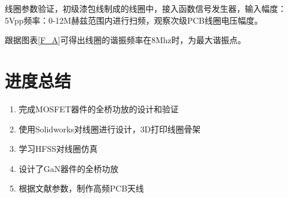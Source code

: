 ﻿\documentclass[UTF-8,a4paper,12pt]{ctexart}
\begin{document}
                
        线圈参数验证，初级漆包线制成的线圈中，接入函数信号发生器，输入幅度：5Vpp频率：0-12M赫兹范围内进行扫频，观察次级PCB线圈电压幅度。
       
        
        \begin{figure}[H]
                \centering
        \end{figure}
        跟据图表\ref{F_A}可得出线圈的谐振频率在8Mhz时，为最大谐振点。

\section{进度总结}
        \begin{enumerate}[$\bullet$]
        \item 完成MOSFET器件的全桥功放的设计和验证
        \item 使用Solidworks对线圈进行设计，3D打印线圈骨架
        \item 学习HFSS对线圈仿真
        \item 设计了GaN器件的全桥功放
        \item 根据文献参数，制作高频PCB天线     

\end{enumerate}

\end{document}
